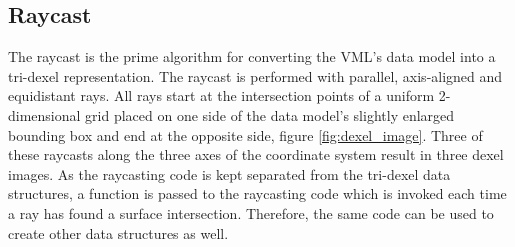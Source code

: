 \subsection{Raycast}
\label{sec:tri_dexel_raycast}

The raycast is the prime algorithm for converting the VML's data model into a tri-dexel representation.
The raycast is performed with parallel, axis-aligned and equidistant rays.
All rays start at the intersection points of a uniform 2-dimensional grid placed on one side of the data model's slightly enlarged bounding box and end at the opposite side, \cf figure \ref{fig:dexel_image}.
Three of these raycasts along the three axes of the coordinate system result in three dexel images.
As the raycasting code is kept separated from the tri-dexel data structures, a function is passed to the raycasting code which is invoked each time a ray has found a surface intersection.
Therefore, the same code can be used to create other data structures as well. %

